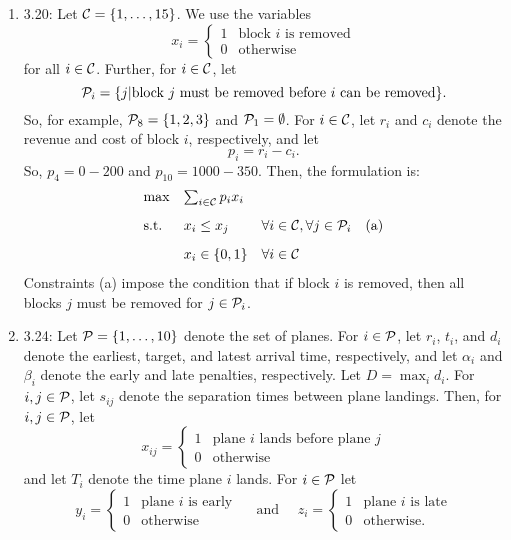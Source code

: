 \documentclass[10pt]{article}
\begin{document}
\begin{enumerate}
\item 3.20: Let ${\cal C} = \{1,\ldots,15\}$. We use the variables 
  \[
  x_i =  \left\{
    \begin{array}{ll}
      1 & \mbox{block $i$ is removed} \\
      0 & \mbox{otherwise}
    \end{array}
    \right.
  \]
  for all $i \in {\cal C}$. Further, for $i \in {\cal C}$, let 
  \[
  {\cal P}_i = \{j | \mbox{block $j$ must be removed before $i$ can be
    removed} \}.
  \]
  So, for example, ${\cal P}_8 = \{1,2,3\}$ and ${\cal P}_1 = \emptyset$.
  For $i \in {\cal C}$, let $r_i$ and $c_i$ denote the revenue
  and cost of block $i$, respectively, and let
  \[
  p_i = r_i - c_i.
  \]
  So, $p_4 = 0 - 200$ and $p_{10} = 1000 - 350$.
  Then, the formulation is:
  \[
  \begin{array}{llll}
    \max & \sum_{i\in {\cal C}} p_i x_i & & \\[3mm]
    \mbox{s.t.} & x_i \leq x_j & \forall i \in {\cal C}, \forall j \in {\cal P}_i & \mbox{(a)} \\[3mm]
    & x_i \in \{0,1\} & \forall i \in {\cal C} & 
  \end{array}
  \]
  Constraints (a) impose the condition that if block $i$ is removed,
  then all blocks $j$ must be removed for $j \in {\cal P}_i$.

\item 3.24: Let ${\cal P} = \{1,\ldots,10\}$ denote the set of planes. For
  $i \in {\cal P}$, let $r_i$, $t_i$, and $d_i$ denote the earliest,
  target, and latest arrival time, respectively, and let $\alpha_i$
  and $\beta_i$ denote the early and late penalties, respectively. Let
  $D = \max_i d_i$. For
  $i,j \in {\cal P}$, let $s_{ij}$ denote the separation times between
  plane landings. Then, for $i,j \in {\cal P}$, let
  \[
  x_{ij} = \left\{
    \begin{array}{ll}
      1 & \mbox{plane $i$ lands before plane $j$} \\
      0 & \mbox{otherwise}
    \end{array}
    \right.
  \]
  and let $T_i$ denote the time plane $i$ lands. For $i \in {\cal P}$ let
  \[
  y_{i} = \left\{
    \begin{array}{ll}
      1 & \mbox{plane $i$ is early} \\
      0 & \mbox{otherwise}
    \end{array}
  \right.
  \quad \mbox{ and } \quad
  z_{i} = \left\{
    \begin{array}{ll}
      1 & \mbox{plane $i$ is late} \\
      0 & \mbox{otherwise.}
    \end{array}
  \right.    
  \]


\end{enumerate}
\end{document}
